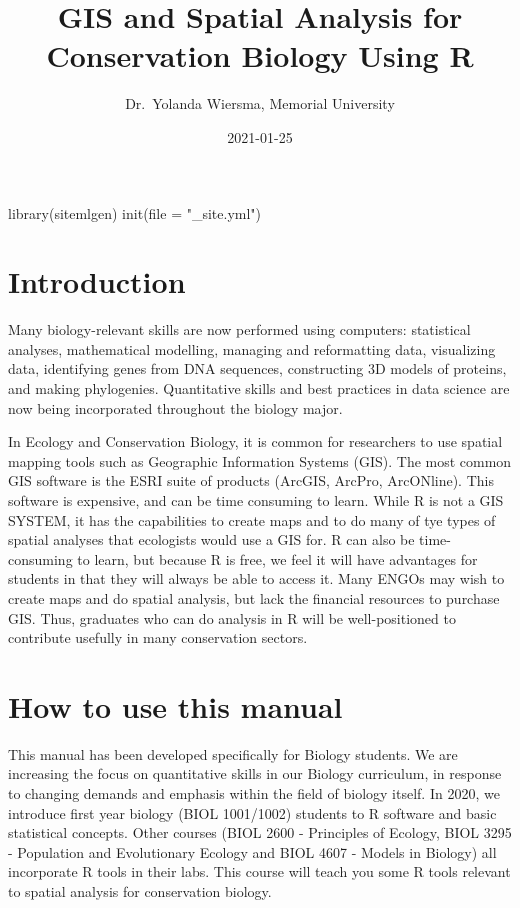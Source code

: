 \documentclass[
]{book}
\title{GIS and Spatial Analysis for Conservation Biology Using R}
\author{Dr.~Yolanda Wiersma, Memorial University}
\date{2021-01-25}
\begin{document}
\maketitle

{
\setcounter{tocdepth}{1}
\tableofcontents
}
library(sitemlgen)
init(file = "\_site.yml")

\hypertarget{intro}{%
\chapter{Introduction}\label{intro}}

Many biology-relevant skills are now performed using computers: statistical analyses, mathematical modelling, managing and reformatting data, visualizing data, identifying genes from DNA sequences, constructing 3D models of proteins, and making phylogenies. Quantitative skills and best practices in data science are now being incorporated throughout the biology major.

In Ecology and Conservation Biology, it is common for researchers to use spatial mapping tools such as Geographic Information Systems (GIS). The most common GIS software is the ESRI suite of products (ArcGIS, ArcPro, ArcONline). This software is expensive, and can be time consuming to learn. While R is not a GIS SYSTEM, it has the capabilities to create maps and to do many of tye types of spatial analyses that ecologists would use a GIS for. R can also be time-consuming to learn, but because R is free, we feel it will have advantages for students in that they will always be able to access it. Many ENGOs may wish to create maps and do spatial analysis, but lack the financial resources to purchase GIS. Thus, graduates who can do analysis in R will be well-positioned to contribute usefully in many conservation sectors.

\hypertarget{howto}{%
\chapter{How to use this manual}\label{howto}}

This manual has been developed specifically for Biology students. We are increasing the focus on quantitative skills in our Biology curriculum, in response to changing demands and emphasis within the field of biology itself. In 2020, we introduce first year biology (BIOL 1001/1002) students to R software and basic statistical concepts. Other courses (BIOL 2600 - Principles of Ecology, BIOL 3295 - Population and Evolutionary Ecology and BIOL 4607 - Models in Biology) all incorporate R tools in their labs. This course will teach you some R tools relevant to spatial analysis for conservation biology.
\end{document}
